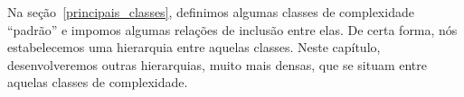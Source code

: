 Na seção~\ref{principais_classes},
definimos algumas classes de complexidade ``padrão''
e impomos algumas relações de inclusão entre elas.
De certa forma, nós estabelecemos uma hierarquia entre aquelas classes.
Neste capítulo,
desenvolveremos outras hierarquias,
muito mais densas,
que se situam entre aquelas classes de complexidade.
